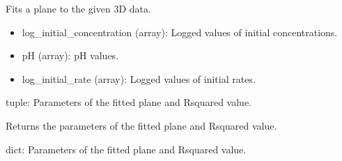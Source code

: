 \documentclass[a4paper,10pt,english]{sphinxmanual}
\begin{document}
\begin{fulllineitems}
\begin{fulllineitems}
\end{fulllineitems}


\begin{fulllineitems}
\label{\detokenize{utils:src.utils.plane3D_plot.Plane3DPlotter.fit_plane}}
\pysigstartsignatures
{}
\pysigstopsignatures
\sphinxAtStartPar
Fits a plane to the given 3D data.
\begin{description}
\begin{itemize}
\item {} 
\sphinxAtStartPar
log\_initial\_concentration (array): Logged values of initial concentrations.

\item {} 
\sphinxAtStartPar
pH (array): pH values.

\item {} 
\sphinxAtStartPar
log\_initial\_rate (array): Logged values of initial rates.

\end{itemize}

\sphinxAtStartPar
tuple: Parameters of the fitted plane and R\sphinxhyphen{}squared value.

\end{description}

\end{fulllineitems}


\begin{fulllineitems}
\label{\detokenize{utils:src.utils.plane3D_plot.Plane3DPlotter.get_results}}
\pysigstartsignatures
{}
\pysigstopsignatures
\sphinxAtStartPar
Returns the parameters of the fitted plane and R\sphinxhyphen{}squared value.
\begin{description}
\sphinxAtStartPar
dict: Parameters of the fitted plane and R\sphinxhyphen{}squared value.

\end{description}


\end{fulllineitems}
\end{fulllineitems}
\end{document}
